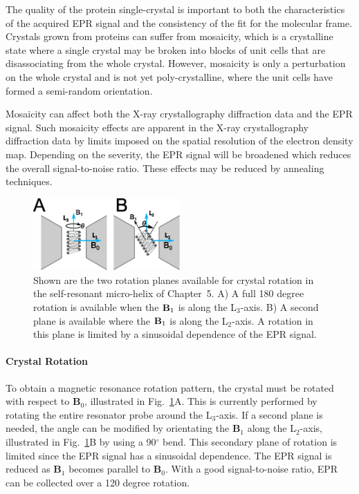 The quality of the protein single-crystal is important to both the characteristics of the acquired EPR signal and the consistency of the fit for the molecular frame. Crystals grown from proteins can suffer from mosaicity, which is a crystalline state where a single crystal may be broken into blocks of unit cells that are disassociating from the whole crystal. However, mosaicity is only a perturbation on the whole crystal and is not yet poly-crystalline, where the unit cells have formed a semi-random orientation. 

Mosaicity can affect both the X-ray crystallography diffraction data and the EPR signal. Such mosaicity effects are apparent in the X-ray crystallography diffraction data by limits imposed on the spatial resolution of the electron density map. \cite{blundell1976protein} Depending on the severity, the EPR signal will be broadened which reduces the overall signal-to-noise ratio. These effects may be reduced by annealing techniques. \cite{Kriminskien0056}

\begin{figure}[htb]
 \centering
 \includegraphics[width=0.5\textwidth]{Kapitel/Ch2-Images/RotateMeLeftRight.eps}
 \caption[Rotation Planes of micro-Helix.]{Shown are the two rotation planes available for crystal rotation in the self-resonant micro-helix of Chapter~5. A) A full 180 degree rotation is available when the ${\textbf B}_1$ is along the L$_3$-axis. B) A second plane is available where the ${\textbf B}_1$ is along the L$_2$-axis. A rotation in this plane is limited by a sinusoidal dependence of the EPR signal. }
 \label{fig:RotateMe}
\end{figure}

\paragraph*{Crystal Rotation} To obtain a magnetic resonance rotation pattern, the crystal must be rotated with respect to $\mathbf{B}_0$, illustrated in Fig.~\ref{fig:RotateMe}A. This is currently performed by rotating the entire resonator probe around the L$_3$-axis. If a second plane is needed, the angle can be modified by orientating the $\mathbf{B}_1$ along the L$_2$-axis, illustrated in Fig.~\ref{fig:RotateMe}B by using a 90$^{\circ}$ bend. This secondary plane of rotation is limited since the EPR signal has a sinusoidal dependence. The EPR signal is reduced as $\mathbf{B}_1$ becomes parallel to $\mathbf{B}_0$. With a good signal-to-noise ratio, EPR can be collected over a 120 degree rotation.

